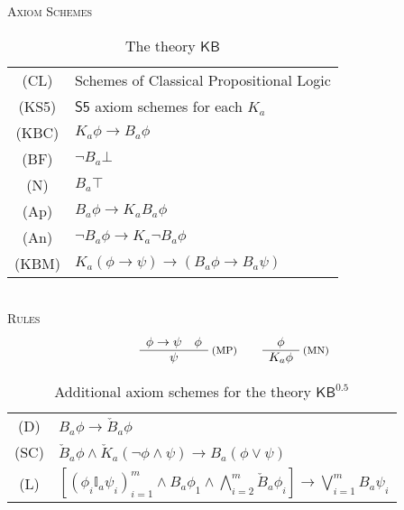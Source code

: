 \documentclass[12pt]{article}
\theoremstyle{definition}
\newcommand{\KB}{{\mathsf{KB}}}                        %
\newcommand{\KBeq}{{\mathsf{KB}^{\mathsf{0.5}}}}       %
\begin{document}
\begin{table}[ht]
  \begin{center}
    \textsc{Axiom Schemes}\\[.4em]
    \renewcommand{\arraystretch}{1.3}
    \begin{tabular}[t]{cl}
      (CL) &
      Schemes of Classical Propositional Logic
      \\
      (KS5) &
      $\mathsf{S5}$ axiom schemes for each $K_a$
      \\
      (KBC) &
      $K_a\phi\to B_a\phi$
      \\
      (BF) &
      $\lnot B_a\bot$
      \\
      (N) &
      $B_a\top$
      \\
      (Ap) &
      $B_a\phi\to K_aB_a\phi$
      \\
      (An) &
      $\lnot B_a\phi\to K_a\lnot B_a\phi$
      \\
      (KBM) &
      $K_a(\phi\to\psi)\to(B_a\phi\to B_a\psi)$
    \end{tabular}
    \renewcommand{\arraystretch}{1.0}
    \\[1em]
    \textsc{Rules}\vspace{-.5em}
    \[
    \begin{array}{c}
      \phi\to\psi \quad \phi
      \\\hline
      \psi
    \end{array}\;\text{\footnotesize(MP)}
    \qquad
    \begin{array}{c}
      \phi
      \\\hline
      K_a\phi
    \end{array}\;\text{\footnotesize(MN)}
    \]
  \end{center}
  \caption{The theory $\KB$}
  \label{table:KB}
\end{table}

\begin{table}[ht]
  \begin{center}
    \renewcommand{\arraystretch}{1.3}
    \begin{tabular}[t]{cl}
      (D) &
      $B_a\phi\to \check B_a\phi$
      \\
      (SC) &
      $\check B_a\phi \land 
      \check K_a(\lnot\phi\land\psi) \to 
      B_a(\phi\lor\psi)$
      \\
      (L) &
      $\textstyle [(\phi_i\mathbb{I}_a\psi_i)_{i=1}^m
      \land B_a\phi_1 \land \bigwedge_{i=2}^m \check B_a\phi_i] \to
      \bigvee_{i=1}^m B_a\psi_i$
    \end{tabular}
  \end{center}
  \caption{Additional axiom schemes for the theory $\KBeq$}
  \label{table:additional-schemes}
\end{table}
\end{document}

